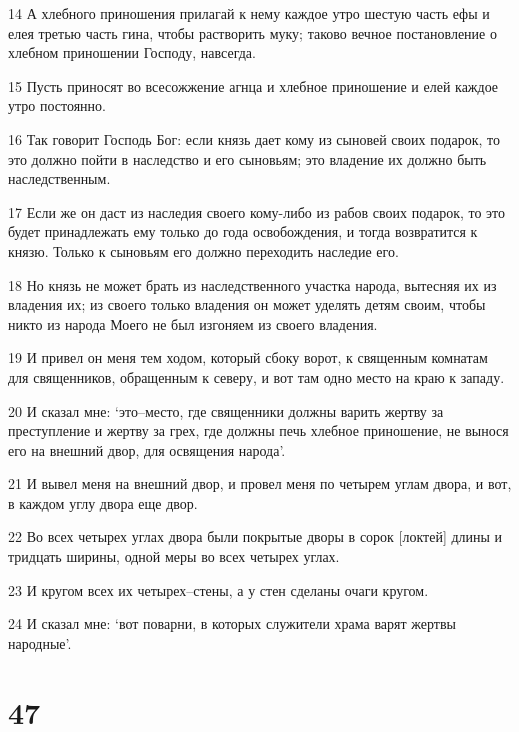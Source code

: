\par 14 А хлебного приношения прилагай к нему каждое утро шестую часть ефы и елея третью часть гина, чтобы растворить муку; таково вечное постановление о хлебном приношении Господу, навсегда.
\par 15 Пусть приносят во всесожжение агнца и хлебное приношение и елей каждое утро постоянно.
\par 16 Так говорит Господь Бог: если князь дает кому из сыновей своих подарок, то это должно пойти в наследство и его сыновьям; это владение их должно быть наследственным.
\par 17 Если же он даст из наследия своего кому-либо из рабов своих подарок, то это будет принадлежать ему только до года освобождения, и тогда возвратится к князю. Только к сыновьям его должно переходить наследие его.
\par 18 Но князь не может брать из наследственного участка народа, вытесняя их из владения их; из своего только владения он может уделять детям своим, чтобы никто из народа Моего не был изгоняем из своего владения.
\par 19 И привел он меня тем ходом, который сбоку ворот, к священным комнатам для священников, обращенным к северу, и вот там одно место на краю к западу.
\par 20 И сказал мне: `это--место, где священники должны варить жертву за преступление и жертву за грех, где должны печь хлебное приношение, не вынося его на внешний двор, для освящения народа'.
\par 21 И вывел меня на внешний двор, и провел меня по четырем углам двора, и вот, в каждом углу двора еще двор.
\par 22 Во всех четырех углах двора были покрытые дворы в сорок [локтей] длины и тридцать ширины, одной меры во всех четырех углах.
\par 23 И кругом всех их четырех--стены, а у стен сделаны очаги кругом.
\par 24 И сказал мне: `вот поварни, в которых служители храма варят жертвы народные'.

\chapter{47}

